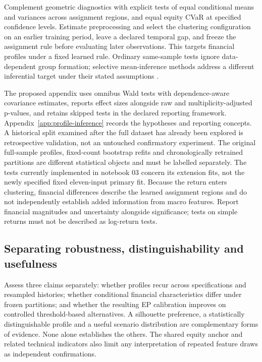 \documentclass[11pt,a4paper]{article}
\begin{document}
Complement geometric diagnostics with explicit tests of equal conditional means and variances across assignment regions, and equal equity CVaR at specified confidence levels. Estimate preprocessing and select the clustering configuration on an earlier training period, leave a declared temporal gap, and freeze the assignment rule before evaluating later observations. This targets financial profiles under a fixed learned rule. Ordinary same-sample tests ignore data-dependent group formation; selective mean-inference methods address a different inferential target under their stated assumptions \cite{chengao2025}.

The proposed appendix uses omnibus Wald tests with dependence-aware covariance estimates, reports effect sizes alongside raw and multiplicity-adjusted p-values, and retains skipped tests in the declared reporting framework. Appendix~\ref{app:profile-inference} records the hypotheses and reporting concepts. A historical split examined after the full dataset has already been explored is retrospective validation, not an untouched confirmatory experiment. The original full-sample profiles, fixed-count bootstrap refits and chronologically retrained partitions are different statistical objects and must be labelled separately. The tests currently implemented in notebook 03 concern its extension fits, not the newly specified fixed eleven-input primary fit. Because the return enters clustering, financial differences describe the learned assignment regions and do not independently establish added information from macro features. Report financial magnitudes and uncertainty alongside significance; tests on simple returns must not be described as log-return tests.

\subsection{Separating robustness, distinguishability and usefulness}

Assess three claims separately: whether profiles recur across specifications and resampled histories; whether conditional financial characteristics differ under frozen partitions; and whether the resulting EP calibration improves on controlled threshold-based alternatives. A silhouette preference, a statistically distinguishable profile and a useful scenario distribution are complementary forms of evidence. None alone establishes the others. The shared equity anchor and related technical indicators also limit any interpretation of repeated feature draws as independent confirmations.
\end{document}
